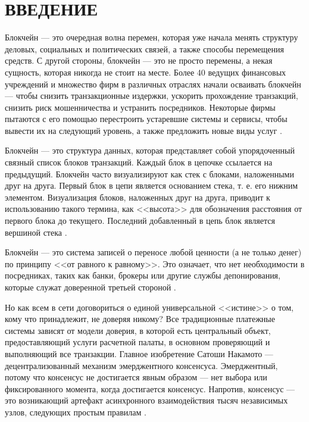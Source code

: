{\centering \chapter*{ВВЕДЕНИЕ}}

Блокчейн --- это очередная волна перемен, которая уже начала менять структуру
деловых, социальных и политических связей, а также способы перемещения
средств. 
С другой стороны, блокчейн --- это не просто перемены, а некая сущность, которая никогда не стоит на месте. 
Более 40 ведущих финансовых учреждений и множество фирм в различных отраслях начали осваивать блокчейн --- чтобы снизить транзакционные издержки, ускорить прохождение транзакций, снизить риск мошенничества и устранить посредников. 
Некоторые фирмы пытаются с его помощью перестроить устаревшие системы и сервисы, чтобы вывести их на следующий уровень, а также предложить новые виды услуг \cite[19]{Singhal2019}.

Блокчейн --- это структура данных, которая представляет собой упорядоченный связный список блоков транзакций. 
Каждый блок в цепочке ссылается на предыдущий. 
Блокчейн часто визуализируют как стек с блоками, наложенными друг на друга. 
Первый блок в цепи является основанием стека, т. е. его нижним элементом. 
Визуализация блоков, наложенных друг на друга, приводит к использованию такого термина, как <<высота>> для обозначения расстояния от первого блока до текущего. Последний добавленный в цепь блок является вершиной стека \cite[163]{Antonopoulos2010}.

Блокчейн --- это система записей о переносе любой ценности (а не только денег) по принципу <<от равного к равному>>. 
Это означает, что нет необходимости в посредниках, таких как банки, брокеры или другие службы депонирования, которые служат доверенной третьей стороной \cite[21]{Singhal2019}.

Но как всем в сети договориться о единой универсальной <<истине>> о том, кому что принадлежит, не доверяя никому? 
Все традиционные платежные системы зависят от модели доверия, в которой есть центральный объект, предоставляющий услуги расчетной палаты, в основном проверяющий и выполняющий все транзакции. 
Главное изобретение Сатоши Накамото --- децентрализованный механизм эмерджентного консенсуса. 
Эмерджентный, потому что консенсус не достигается явным образом --- нет выбора или фиксированного момента, когда достигается консенсус. 
Напротив, консенсус --- это возникающий артефакт асинхронного взаимодействия тысяч независимых узлов, следующих простым правилам \cite[181]{Antonopoulos2010}.

